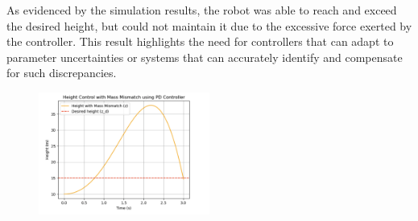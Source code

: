 \documentclass[letterpaper, 10 pt, conference]{ieeeconf}  %
\begin{document}
As evidenced by the simulation results, the robot was able to reach and exceed the desired height, but could not maintain it due to the excessive force exerted by the controller. This result highlights the need for controllers that can adapt to parameter uncertainties or systems that can accurately identify and compensate for such discrepancies.

\begin{figure}[htbp]
    \centering
    \includegraphics[width=0.5\textwidth]{image6.png}
    \label{fig:enter-label}
\end{figure}
\end{document}
